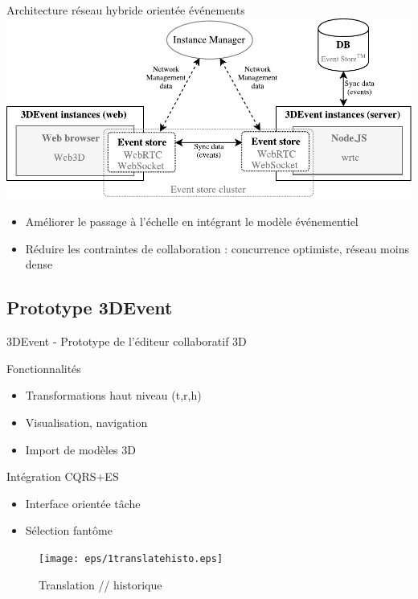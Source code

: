 \begin{frame}{Architecture réseau hybride orientée \cite{Desprat2017}
événements}
	{\centering
	\includegraphics[width=0.7\columnwidth]{eps/archi.pdf}}


\begin{itemize}
	\item Améliorer le passage à l'échelle en intégrant le modèle événementiel
	\item Réduire les contraintes de collaboration : concurrence optimiste, réseau 
	moins dense
\end{itemize}

\end{frame}

\subsection{Prototype 3DEvent}

\begin{frame}{3DEvent - Prototype de l'éditeur collaboratif 3D}
	\begin{minipage}{.5\columnwidth}
	Fonctionnalités
	\begin{itemize}
		\item Transformations haut niveau (t,r,h)
		\item Visualisation, navigation
		\item Import de modèles 3D
	\end{itemize}
	Intégration CQRS+ES
	\begin{itemize}
		\item Interface orientée tâche 
		\item Sélection fantôme
	\end{itemize}
	\end{minipage}\hfill
	\begin{minipage}{.5\columnwidth}
		\begin{figure}
			\centering
			\texttt{[image: eps/1translatehisto.eps]}
			\caption{Translation // historique}
		\end{figure}
	\end{minipage}
\end{frame}



